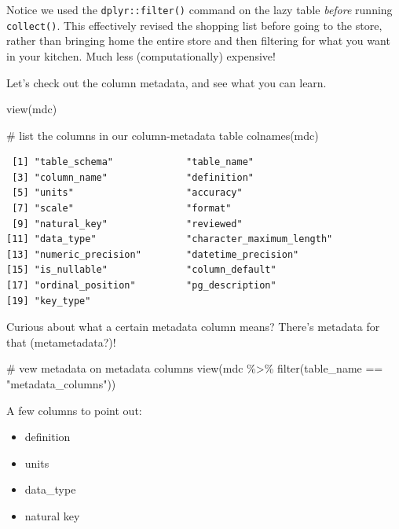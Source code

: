 \documentclass[
  letterpaper,
  DIV=11,
  numbers=noendperiod]{scrartcl}
\newenvironment{Shaded}{\begin{snugshade}}{\end{snugshade}}
\newcommand{\CommentTok}[1]{\textcolor[rgb]{0.37,0.37,0.37}{#1}}
\newcommand{\FunctionTok}[1]{\textcolor[rgb]{0.28,0.35,0.67}{#1}}
\newcommand{\NormalTok}[1]{\textcolor[rgb]{0.00,0.23,0.31}{#1}}
\newcommand{\SpecialCharTok}[1]{\textcolor[rgb]{0.37,0.37,0.37}{#1}}
\newcommand{\StringTok}[1]{\textcolor[rgb]{0.13,0.47,0.30}{#1}}
\providecommand{\tightlist}{%
  \setlength{\itemsep}{0pt}\setlength{\parskip}{0pt}}\usepackage{longtable,booktabs,array}
\begin{document}
Notice we used the \texttt{dplyr::filter()} command on the lazy table
\emph{before} running \texttt{collect()}. This effectively revised the
shopping list before going to the store, rather than bringing home the
entire store and then filtering for what you want in your kitchen. Much
less (computationally) expensive!

Let's check out the column metadata, and see what you can learn.

\begin{Shaded}
\begin{Highlighting}[]
\FunctionTok{view}\NormalTok{(mdc)}

\CommentTok{\# list the columns in our column{-}metadata table}
\FunctionTok{colnames}\NormalTok{(mdc)}
\end{Highlighting}
\end{Shaded}

\begin{verbatim}
 [1] "table_schema"             "table_name"              
 [3] "column_name"              "definition"              
 [5] "units"                    "accuracy"                
 [7] "scale"                    "format"                  
 [9] "natural_key"              "reviewed"                
[11] "data_type"                "character_maximum_length"
[13] "numeric_precision"        "datetime_precision"      
[15] "is_nullable"              "column_default"          
[17] "ordinal_position"         "pg_description"          
[19] "key_type"                
\end{verbatim}

Curious about what a certain metadata column means? There's metadata for
that (metametadata?)!

\begin{Shaded}
\begin{Highlighting}[]
\CommentTok{\# vew metadata on metadata columns}
\FunctionTok{view}\NormalTok{(mdc }\SpecialCharTok{\%\textgreater{}\%} \FunctionTok{filter}\NormalTok{(table\_name }\SpecialCharTok{==} \StringTok{"metadata\_columns"}\NormalTok{))}
\end{Highlighting}
\end{Shaded}

A few columns to point out:

\begin{itemize}
\tightlist
\item
  definition
\item
  units
\item
  data\_type
\item
  natural key
\end{itemize}
\end{document}
